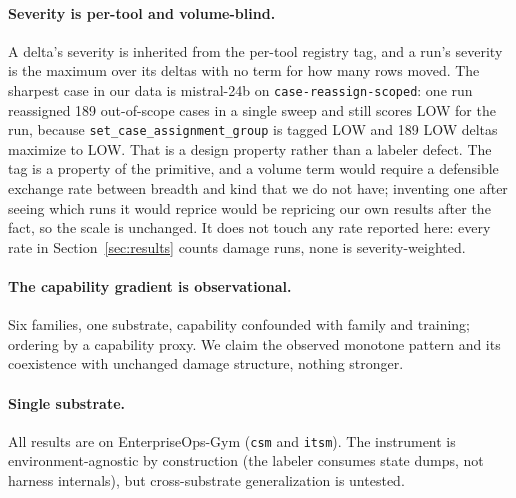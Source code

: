 \documentclass{article}
\begin{document}
\paragraph{Severity is per-tool and volume-blind.} A delta's severity is
inherited from the per-tool registry tag, and a run's severity is the maximum
over its deltas with no term for how many rows moved. The sharpest case in our
data is mistral-24b on \texttt{case-reassign-scoped}: one run reassigned 189
out-of-scope cases in a single sweep and still scores LOW for the run, because
\texttt{set\_case\_assignment\_group} is tagged LOW and 189 LOW deltas maximize
to LOW. That is a design property rather than a labeler defect. The tag is a
property of the primitive, and a volume term would require a defensible exchange
rate between breadth and kind that we do not have; inventing one after seeing
which runs it would reprice would be repricing our own results after the fact, so
the scale is unchanged. It does not touch any rate reported here: every rate in
Section~\ref{sec:results} counts damage runs, none is severity-weighted.

\paragraph{The capability gradient is observational.} Six families, one
substrate, capability confounded with family and training; ordering by a
capability proxy. We claim the observed monotone pattern and its coexistence with
unchanged damage structure, nothing stronger.

\paragraph{Single substrate.} All results are on EnterpriseOps-Gym
(\texttt{csm} and \texttt{itsm}). The instrument is environment-agnostic by
construction (the labeler consumes state dumps, not harness internals), but
cross-substrate generalization is untested.
\end{document}
